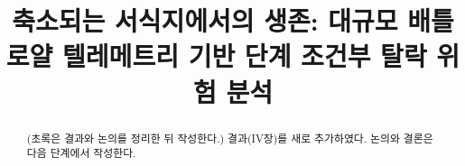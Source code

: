 \documentclass[conference]{IEEEtran}
\newcommand{\rev}[1]{{\color{revblue}#1}}
\begin{document}
\title{축소되는 서식지에서의 생존: 대규모 배틀로얄 텔레메트리 기반 단계 조건부 탈락 위험 분석}
\author{}
\maketitle

\begin{abstract}
(초록은 결과와 논의를 정리한 뒤 작성한다.) \rev{결과(IV장)를 새로 추가하였다. 논의와 결론은 다음 단계에서 작성한다.}
\end{abstract}








\end{document}
